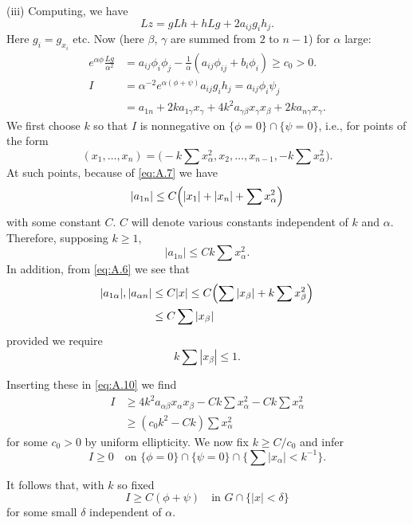 (iii) Computing, we have
\begin{equation}\label{eq:A.9}
  Lz = gLh + hLg + 2a_{ij}g_ih_j.
\end{equation}
Here $g_i=g_{x_i}$ etc. Now (here $\beta$, $\gamma$ are summed from $2$ to $n-1$)
for $\alpha$ large:
\begin{equation}\label{eq:A.10}
  \begin{aligned}
    e^{\alpha\phi}\frac{Lg}{\alpha^2}
    & = a_{ij}\phi_i\phi_j - \frac{1}{\alpha} (a_{ij}\phi_{ij}+b_i\phi_i) \geq c_0>0. \\
    I
    & = \alpha^{-2} e^{\alpha(\phi+\psi)} a_{ij}g_ih_j = a_{ij}\phi_i\psi_j \\
    & = a_{1n} + 2ka_{1\gamma}x_{\gamma} + 4k^2 a_{\gamma\beta} x_{\gamma} x_{\beta}
        + 2ka_{n\gamma}x_{\gamma}.
  \end{aligned}
\end{equation}
We first choose $k$ so that $I$ is nonnegative on $\{\phi=0\}\cap\{\psi=0\}$,
i.e., for points of the form
\[(x_1,\ldots,x_n) = \biggl(-k\sum x_{\alpha}^2, x_2, \ldots, x_{n-1},
  -k\sum x_{\alpha}^2\biggr).\]
At such points, because of \eqref{eq:A.7} we have
\[|a_{1n}| \leq C\Bigl(|x_1| + |x_n| + \sum x_{\alpha}^2\Bigr)\]
with some constant $C$. $C$ will denote various constants independent of $k$
and $\alpha$. Therefore, supposing $k\geq 1$,
\[|a_{1n}| \leq Ck\sum x_{\alpha}^2.\]
In addition, from \eqref{eq:A.6} we see that
\begin{align*}
  |a_{1\alpha}|, |a_{\alpha n}|
  & \leq C|x| \leq C\Bigl(\sum |x_{\beta}| + k\sum x_{\beta}^2\Bigr) \\
  & \leq C\sum |x_{\beta}|
\end{align*}
provided we require
\[k \sum |x_{\beta}| \leq 1.\]

Inserting these in \eqref{eq:A.10} we find
\begin{align*}
  I & \geq 4k^2a_{\alpha\beta} x_{\alpha} x_{\beta} - Ck\sum x_\alpha^2 - Ck\sum x_\alpha^2 \\
    & \geq (c_0k^2-Ck)\sum x_\alpha^2
\end{align*}
for some $c_0>0$ by uniform ellipticity. We now fix $k\geq C/c_0$ and infer
\[I \geq 0\quad \text{on } \{\phi=0\}\cap\{\psi=0\}\cap\bigl\{\sum |x_\alpha|<k^{-1}\bigr\}.\]

It follows that, with $k$ so fixed
\begin{equation}\label{eq:A.11}
  I \geq C(\phi+\psi)\quad \text{in } G\cap\{|x|<\delta\}
\end{equation}
for some small $\delta$ independent of $\alpha$.

